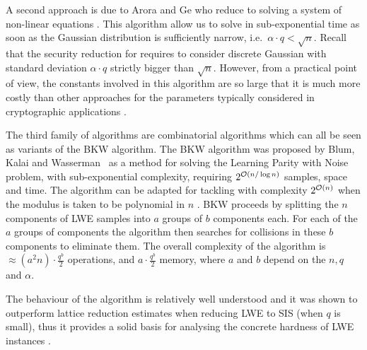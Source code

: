A second approach is due to Arora and Ge who reduce \LWE to solving a  system of non-linear equations \cite{arora-ge:icalp2011}. This algorithm allow us to solve \LWE in sub-exponential time as soon as the Gaussian distribution  is sufficiently narrow, i.e.\ $\alpha \cdot q <\sqrt{n}$. Recall that  the security reduction \cite{regev:acm09} for \LWE requires to consider discrete Gaussian  with standard deviation $\alpha \cdot q$ strictly bigger than $\sqrt{n}$.
However, from a practical point of view, the constants involved in this algorithm are so large that it is much more costly than other approaches for the parameters typically considered in cryptographic applications \cite{SCC12_AG}. 

The third family of algorithms are combinatorial algorithms which can all be seen as variants of the BKW algorithm. The BKW algorithm was proposed by Blum, Kalai and Wasserman~\cite{blum-kalai-wasserman:acm2003} as a method for solving the Learning Parity with Noise problem, with sub-exponential complexity, requiring $2^{\mathcal{O}\left(n / \log n\right)}$ samples, space and time. The algorithm can be adapted for tackling \LWE with complexity $2^{\mathcal{O}\left(n\right)}$ when the modulus is taken to be polynomial in $n$ \cite{regev:acm09}. BKW proceeds by splitting the $n$ components of LWE samples into $a$ groups of $b$ components each. For each of the $a$ groups of components the algorithm then searches for collisions in these $b$ components to eliminate them. The overall complexity of the algorithm is  $\approx \left(a^2n\right) \cdot \frac{q^b}{2}$ operations, and $a\cdot \frac{q^b}{2}$ memory, where $a$ and $b$ depend on the $n, q$ and $\alpha$.

The behaviour of the algorithm is relatively well understood and it was shown to outperform lattice reduction estimates when reducing LWE to SIS (when $q$ is small), thus it provides a solid basis for analysing the concrete hardness of LWE instances \cite{albrecht-cid-faugere-fitzpatrick-perret:dcc2013}.


